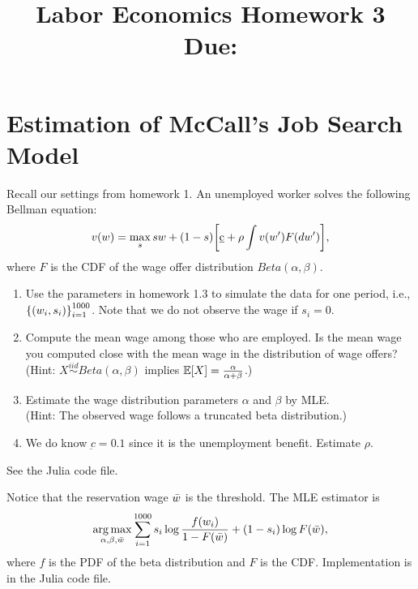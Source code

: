 \documentclass[12pt]{article}
\title{
    Labor Economics Homework 3 \\
    \large Due: \\
    }
\author{}
\date{}
\begin{document}

\maketitle
\vspace{-2cm}

\section{Estimation of McCall's Job Search Model} 
Recall our settings from homework 1. An unemployed worker solves the 
following Bellman equation:
\begin{equation*}
    v(w) = \max_{s} sw + (1-s)\sbrc{\underbar{c} + \rho \int v(w') F(dw')},
\end{equation*}
where $F$ is the CDF of the wage offer distribution $Beta(\alpha, \beta)$.
\begin{enumerate}
    \item Use the parameters in homework 1.3 to simulate the data 
    for one period, i.e., $\left\{ {(w_i, s_i)} \right\}_{i=1}^{1000}$. 
    Note that we do not observe the wage if $s_i = 0$.
    \item Compute the mean wage among those who are employed. Is the mean wage you computed
    close with the mean wage in the distribution of wage offers? \\
    (Hint: $X\overset{iid}{\sim}Beta(\alpha, \beta)$ implies $\Ex{X} = \frac{\alpha}{\alpha + \beta}$.)
    \item Estimate the wage distribution parameters $\alpha$ and $\beta$ by MLE. \\
    (Hint: The observed wage follows a truncated beta distribution.) 
    \item We do know $\underbar{c} = 0.1$ since it is the unemployment benefit. 
    Estimate $\rho$.
\end{enumerate}

\begin{sol}[1.1, 1.2, 1.4]
    See the Julia code file.
\end{sol} 

\begin{sol}[1.3]
    Notice that the reservation wage $\Bar{w}$ is the threshold. The MLE estimator is 
    \begin{equation*}
        \operatorname*{arg\,max}_{\alpha, \beta, \Bar{w}} \sum_{i=1}^{1000} s_i\log \frac{f(w_i)}{1 - F(\Bar{w})} + (1-s_i)\log F(\Bar{w}),
    \end{equation*}
    where $f$ is the PDF of the beta distribution and $F$ is the CDF. Implementation is in the Julia code file.
\end{sol}
\end{document}
